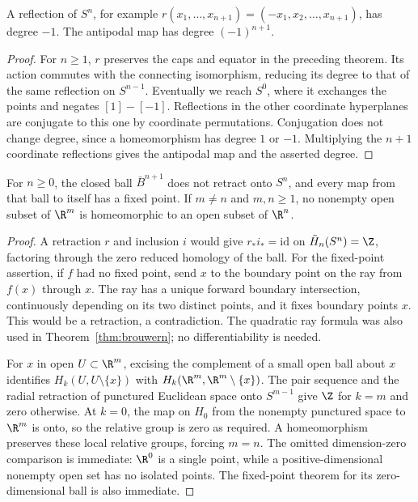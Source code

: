 \begin{proposition}\label{prop:reflection}
A reflection of $S^n$, for example $r(x_1,\ldots,x_{n+1})=(-x_1,x_2,\ldots,x_{n+1})$, has degree $-1$. The antipodal map has degree $(-1)^{n+1}$.
\end{proposition}

\begin{proof}
For $n\ge1$, $r$ preserves the caps and equator in the preceding theorem. Its action commutes with the connecting isomorphism, reducing its degree to that of the same reflection on $S^{n-1}$. Eventually we reach $S^0$, where it exchanges the points and negates $[1]-[-1]$. Reflections in the other coordinate hyperplanes are conjugate to this one by coordinate permutations. Conjugation does not change degree, since a homeomorphism has degree $1$ or $-1$. Multiplying the $n+1$ coordinate reflections gives the antipodal map and the asserted degree.
\end{proof}

\begin{corollary}\label{cor:brouwerH}
For $n\ge0$, the closed ball $\bar B^{n+1}$ does not retract onto $S^n$, and every map from that ball to itself has a fixed point. If $m\ne n$ and $m,n\ge1$, no nonempty open subset of $\R^m$ is homeomorphic to an open subset of $\R^n$.
\end{corollary}

\begin{proof}
A retraction $r$ and inclusion $i$ would give $r_*i_*=\mathrm{id}$ on $\tilde H_n(S^n)=\Z$, factoring through the zero reduced homology of the ball. For the fixed-point assertion, if $f$ had no fixed point, send $x$ to the boundary point on the ray from $f(x)$ through $x$. The ray has a unique forward boundary intersection, continuously depending on its two distinct points, and it fixes boundary points $x$. This would be a retraction, a contradiction. The quadratic ray formula was also used in Theorem~\ref{thm:brouwern}; no differentiability is needed.

For $x$ in open $U\subset\R^m$, excising the complement of a small open ball about $x$ identifies $H_k(U,U\setminus\{x\})$ with $H_k(\R^m,\R^m\setminus\{x\})$. The pair sequence and the radial retraction of punctured Euclidean space onto $S^{m-1}$ give $\Z$ for $k=m$ and zero otherwise. At $k=0$, the map on $H_0$ from the nonempty punctured space to $\R^m$ is onto, so the relative group is zero as required. A homeomorphism preserves these local relative groups, forcing $m=n$. The omitted dimension-zero comparison is immediate: $\R^0$ is a single point, while a positive-dimensional nonempty open set has no isolated points. The fixed-point theorem for its zero-dimensional ball is also immediate.
\end{proof}

